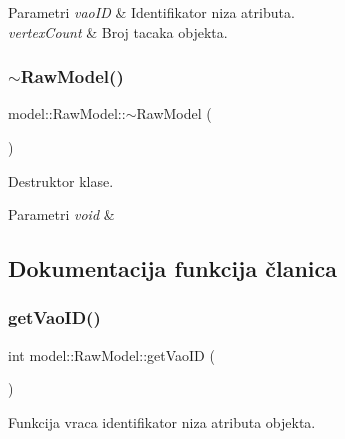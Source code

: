 \begin{DoxyParams}{Parametri}
{\em vao\+ID} & Identifikator niza atributa. \\
\hline
{\em vertex\+Count} & Broj tacaka objekta. \\
\hline
\end{DoxyParams}
\mbox{\label{classmodel_1_1RawModel_a44e687484478b0747abe25baa3533b71}} 
\subsubsection{\texorpdfstring{$\sim$\+Raw\+Model()}{~RawModel()}}
{\footnotesize\ttfamily model\+::\+Raw\+Model\+::$\sim$\+Raw\+Model (\begin{DoxyParamCaption}{ }\end{DoxyParamCaption})}



Destruktor klase. 


\begin{DoxyParams}{Parametri}
{\em void} & \\
\hline
\end{DoxyParams}


\subsection{Dokumentacija funkcija članica}
\mbox{\label{classmodel_1_1RawModel_a8132ec85cbc5f5286534ed6d67ee69ad}} 
\subsubsection{\texorpdfstring{get\+Vao\+I\+D()}{getVaoID()}}
{\footnotesize\ttfamily int model\+::\+Raw\+Model\+::get\+Vao\+ID (\begin{DoxyParamCaption}\item[{void}]{ }\end{DoxyParamCaption})}



Funkcija vraca identifikator niza atributa objekta. 


